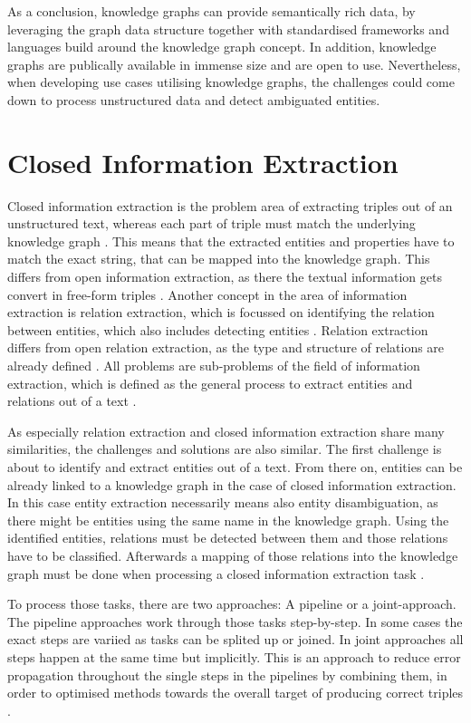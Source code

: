 \documentclass[a4paper,oneside,bibliography=totoc]{scrbook}
\begin{document}
As a conclusion, knowledge graphs can provide semantically rich data, by leveraging the graph data structure together with standardised frameworks and languages build around the knowledge graph concept. In addition, knowledge graphs are publically available in immense size and are open to use. Nevertheless, when developing use cases utilising knowledge graphs, the challenges could come down to process unstructured data and detect ambiguated entities.

\section{Closed Information Extraction}
\label{sec:closed_information_extraction}
Closed information extraction is the problem area of extracting triples out of an unstructured text, whereas each part of triple must match the underlying knowledge graph \cite{Josifoski2021}. This means that the extracted entities and properties have to match the exact string, that can be mapped into the knowledge graph. This differs from open information extraction, as there the textual information gets convert in free-form triples \cite{Etzioni2008}.
Another concept in the area of information extraction is relation extraction, which is focussed on identifying the relation between entities, which also includes detecting entities \cite{Zhao2024}. Relation extraction differs from open relation extraction, as the type and structure of relations are already defined \cite{Kamp2023}. All problems are sub-problems of the field of information extraction, which is defined as the general process to extract entities and relations out of a text \cite{Etzioni2008}.

As especially relation extraction and closed information extraction share many similarities, the challenges and solutions are also similar. The first challenge is about to identify and extract entities out of a text. From there on, entities can be already linked to a knowledge graph in the case of closed information extraction. In this case entity extraction necessarily means also entity disambiguation, as there might be entities using the same name in the knowledge graph. Using the identified entities, relations must be detected between them and those relations have to be classified. Afterwards a mapping of those relations into the knowledge graph must be done when processing a closed information extraction task \cite{Josifoski2021,Zhao2024}.

To process those tasks, there are two approaches: A pipeline or a joint-approach. The pipeline approaches work through those tasks step-by-step. In some cases the exact steps are variied as tasks can be splited up or joined. In joint approaches all steps happen at the same time but implicitly. This is an approach to reduce error propagation throughout the single steps in the pipelines by combining them, in order to optimised methods towards the overall target of producing correct triples \cite{Zhao2024,Josifoski2021}.
\end{document}
